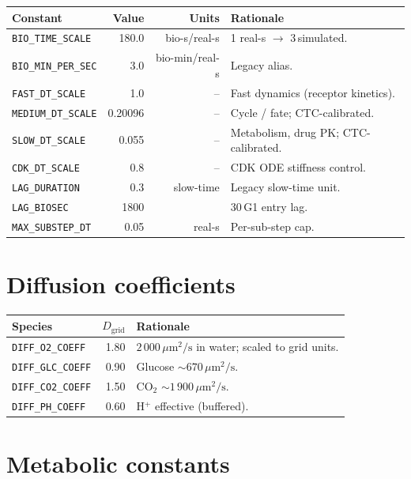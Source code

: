 \documentclass[11pt,letterpaper,twoside,openany]{book}
\newcommand{\code}[1]{\texttt{#1}}
\newcommand{\biomin}{\text{bio-min}}
\newcommand{\biosec}{\text{bio-s}}
\newcommand{\um}{\ensuremath{\mu\text{m}}}
\begin{document}
\begin{longtable}{p{4.6cm}rrp{6.0cm}}
\toprule
\textbf{Constant} & \textbf{Value} & \textbf{Units} & \textbf{Rationale}\\ \midrule
\code{BIO\_TIME\_SCALE}         & 180.0   & bio-s/real-s & 1 real-s $\to$ 3\,\biomin simulated.\\
\code{BIO\_MIN\_PER\_SEC}       & 3.0     & bio-min/real-s & Legacy alias.\\
\code{FAST\_DT\_SCALE}          & 1.0     & --           & Fast dynamics (receptor kinetics).\\
\code{MEDIUM\_DT\_SCALE}        & 0.20096 & --           & Cycle / fate; CTC-calibrated.\\
\code{SLOW\_DT\_SCALE}          & 0.055   & --           & Metabolism, drug PK; CTC-calibrated.\\
\code{CDK\_DT\_SCALE}           & 0.8     & --           & CDK ODE stiffness control.\\
\code{LAG\_DURATION}            & 0.3     & slow-time    & Legacy slow-time unit.\\
\code{LAG\_BIOSEC}              & 1800    & \biosec      & 30\,\biomin G1 entry lag.\\
\code{MAX\_SUBSTEP\_DT}         & 0.05    & real-s       & Per-sub-step cap.\\
\bottomrule
\end{longtable}

\section{Diffusion coefficients}

\begin{longtable}{lrl}
\toprule
Species & $D_\text{grid}$ & Rationale\\ \midrule
\code{DIFF\_O2\_COEFF}    & 1.80 & $2\,000\,\um^2/\text{s}$ in water; scaled to grid units.\\
\code{DIFF\_GLC\_COEFF}   & 0.90 & Glucose $\sim 670\,\um^2/\text{s}$.\\
\code{DIFF\_CO2\_COEFF}   & 1.50 & CO$_2$ $\sim 1\,900\,\um^2/\text{s}$.\\
\code{DIFF\_PH\_COEFF}    & 0.60 & H$^+$ effective (buffered).\\
\bottomrule
\end{longtable}

\section{Metabolic constants}
\end{document}
